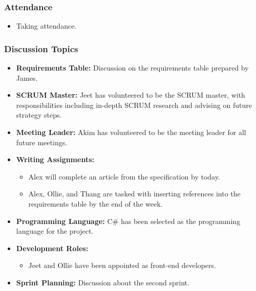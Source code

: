 \documentclass[12pt]{article}
\begin{document}
\hypertarget{attendance-1}{%
\subsubsection{Attendance}\label{attendance-1}}

\begin{itemize}
\tightlist
\item
  Taking attendance.
\end{itemize}

\hypertarget{discussion-topics}{%
\subsubsection{Discussion Topics}\label{discussion-topics}}

\begin{itemize}
\tightlist
\item
  \textbf{Requirements Table:} Discussion on the requirements table
  prepared by James.
\item
  \textbf{SCRUM Master:} Jeet has volunteered to be the SCRUM master,
  with responsibilities including in-depth SCRUM research and advising
  on future strategy steps.
\item
  \textbf{Meeting Leader:} Akim has volunteered to be the meeting leader
  for all future meetings.
\item
  \textbf{Writing Assignments:}

  \begin{itemize}
  \tightlist
  \item
    Alex will complete an article from the specification by today.
  \item
    Alex, Ollie, and Thang are tasked with inserting references into the
    requirements table by the end of the week.
  \end{itemize}
\item
  \textbf{Programming Language:} C\# has been selected as the
  programming language for the project.
\item
  \textbf{Development Roles:}

  \begin{itemize}
  \tightlist
  \item
    Jeet and Ollie have been appointed as front-end developers.
  \end{itemize}
\item
  \textbf{Sprint Planning:} Discussion about the second sprint.
\end{itemize}
\end{document}
